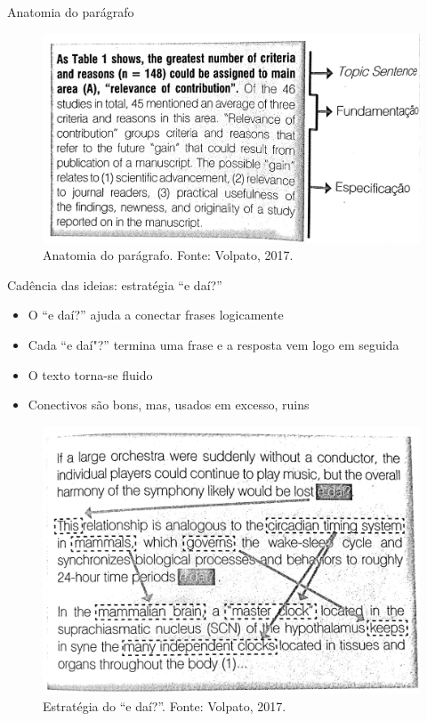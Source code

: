 \begin{frame}{Anatomia do parágrafo}
\begin{figure}
\centering
\includegraphics[scale=0.35]{figs/05/anatomia-paragrafo}
\caption{Anatomia do parágrafo. Fonte: Volpato, 2017.}
\end{figure}
\end{frame}

\begin{frame}{Cadência das ideias: estratégia ``e daí?''}
\begin{itemize}
\item O ``e daí?'' ajuda a conectar frases logicamente
\item Cada ``e daí"?'' termina uma frase e a resposta vem logo em seguida
\item O texto torna-se fluido
\item Conectivos são bons, mas, usados em excesso, ruins
\end{itemize}
\end{frame}

\begin{frame}
\begin{figure}
\centering
\includegraphics[scale=0.35]{figs/05/edai}
\caption{Estratégia do ``e daí?''. Fonte: Volpato, 2017.}
\end{figure}
\end{frame}

